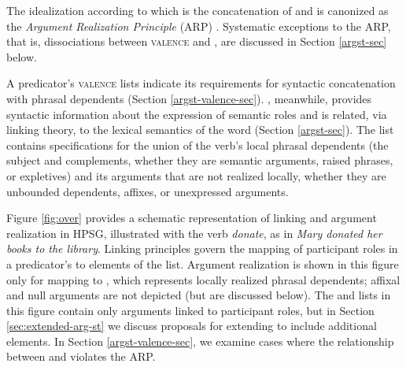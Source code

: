 \documentclass[output=paper
                ,modfonts
                ,nonflat
	        ,collection
	        ,collectionchapter
	        ,collectiontoclongg
 	        ,biblatex
                ,babelshorthands
                ,newtxmath
                ,draftmode
                ,colorlinks, citecolor=brown
]{./langsci/langscibook}
\begin{document}
\noindent
The idealization according to which \argst is the concatenation of \subj and \comps is canonized as the \emph{Argument Realization Principle} (ARP)  \citep[494]{SWB2003a}.  Systematic exceptions to the ARP, that is, dissociations between \textsc{valence} and \argst, are discussed in Section \ref{argst-sec} below.  

A predicator's \textsc{valence} lists indicate its requirements for syntactic concatenation with phrasal dependents (Section \ref{argst-valence-sec}). 
\argst, meanwhile, provides syntactic information about the expression of semantic roles and is related, via linking theory, to the lexical semantics of the word (Section \ref{argst-sec}).  
The \argst list contains specifications for the union of the verb's local phrasal dependents (the subject and complements, whether they are semantic arguments, raised phrases, or expletives) and its arguments that are not realized locally, whether they are unbounded dependents, affixes, or unexpressed arguments. 

Figure \ref{fig:over} provides a schematic representation of %
linking and argument realization in HPSG,  illustrated with the verb \textit{donate}, as in \textit{Mary donated her books to the library}.   Linking principles govern the mapping of participant roles in a predicator's \content to %
elements of the \argst list.   Argument realization is shown in this figure only for mapping to \val, which represents locally realized phrasal dependents; affixal and null arguments are not depicted (but are discussed below).
The \argst and \val lists in this figure contain only arguments linked to participant roles,   but in Section \ref{sec:extended-arg-st} we discuss proposals for extending \argst to include additional elements.
In Section \ref{argst-valence-sec}, we examine cases where the relationship between \argst and \val
violates the ARP.
\end{document}
